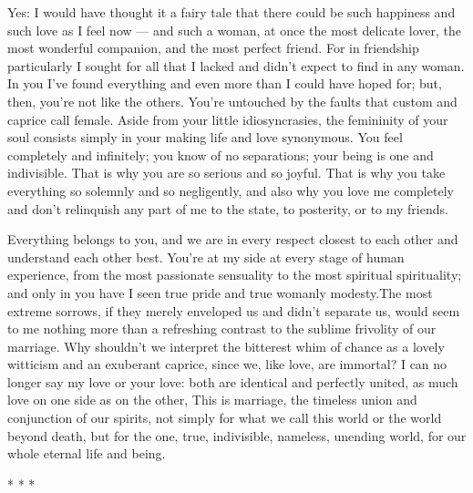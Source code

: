 \begin{quotex}
Yes: I would have thought it a fairy tale that there could be such happiness and such love as I feel now — and such a woman, at once the most delicate lover, the most wonderful companion, and the most perfect friend. For in friendship particularly I sought for all that I lacked and didn't expect to find in any woman. In you I've found everything and even more than I could have hoped for; but, then, you're not like the others. You're untouched by the faults that custom and caprice call female. Aside from your little idiosyncrasies, the femininity of your soul consists simply in your making life and love synonymous. You feel completely and infinitely; you know of no separations; your being is one and indivisible. That is why you are so serious and so joyful. That is why you take everything so solemnly and so negligently, and also why you love me completely and don't relinquish any part of me to the state, to posterity, or to my friends.

Everything belongs to you, and we are in every respect closest to each other and understand each other best. You're at my side at every stage of human experience, from the most passionate sensuality to the most spiritual spirituality; and only in you have I seen true pride and true womanly modesty.The most extreme sorrows, if they merely enveloped us and didn't separate us, would seem to me nothing more than a refreshing contrast to the sublime frivolity of our marriage. Why shouldn't we interpret the bitterest whim of chance as a lovely witticism and an exuberant caprice, since we, like love, are immortal? I can no longer say my love or your love: both are identical and perfectly united, as much love on one side as on the other, This is marriage, the timeless union and conjunction of our spirits, not simply for what we call this world or the world beyond death, but for the one, true, indivisible, nameless, unending world, for our whole eternal life and being.
\end{quotex}

\begin{center}* * *\end{center}

